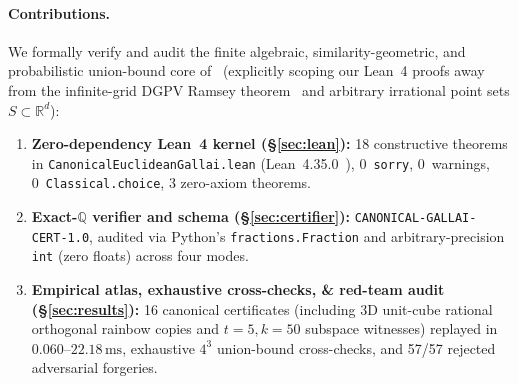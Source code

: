 \documentclass[11pt,twocolumn]{article}
\newcommand{\QQ}{\mathbb{Q}}
\begin{document}
\paragraph{Contributions.}
We formally verify and audit the finite algebraic, similarity-geometric, and probabilistic union-bound core of~\cite{randallshaw2026gallai} (explicitly scoping our Lean~4 proofs away from the infinite-grid DGPV Ramsey theorem~\cite{deuber1983canonical} and arbitrary irrational point sets $S \subset \mathbb{R}^d$):
\begin{enumerate}[leftmargin=*,nosep]
  \item \textbf{Zero-dependency Lean~4 kernel (\S\ref{sec:lean}):} 18 constructive theorems in \texttt{CanonicalEuclideanGallai.lean} (Lean~4.35.0~\cite{demoura2021lean4}), 0~\texttt{sorry}, 0~warnings, 0~\texttt{Classical.choice}, 3 zero-axiom theorems.
  \item \textbf{Exact-$\QQ$ verifier and schema (\S\ref{sec:certifier}):} \texttt{CANONICAL-GALLAI-CERT-1.0}, audited via Python's \texttt{fractions.Fraction} and arbitrary-precision \texttt{int} (zero floats) across four modes.
  \item \textbf{Empirical atlas, exhaustive cross-checks, \& red-team audit (\S\ref{sec:results}):} 16 canonical certificates (including 3D unit-cube rational orthogonal rainbow copies and $t=5, k=50$ subspace witnesses) replayed in $0.060$--$22.18\,\mathrm{ms}$, exhaustive $4^3$ union-bound cross-checks, and 57/57 rejected adversarial forgeries.
\end{enumerate}
\end{document}
